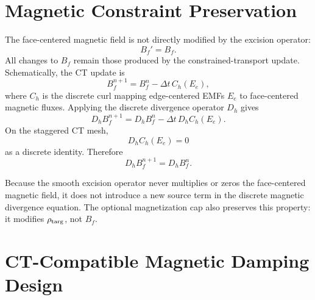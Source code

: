 \documentclass[11pt]{article}
\begin{document}
\section{Magnetic Constraint Preservation}

The face-centered magnetic field is not directly modified by the excision
operator:
\begin{equation}
  B_f' = B_f .
\end{equation}
All changes to \(B_f\) remain those produced by the constrained-transport
update.  Schematically, the CT update is
\begin{equation}
  B_f^{n+1}
  =
  B_f^n
  -
  \Delta t\, C_h(E_e),
\end{equation}
where \(C_h\) is the discrete curl mapping edge-centered EMFs \(E_e\) to
face-centered magnetic fluxes.  Applying the discrete divergence operator
\(D_h\) gives
\begin{equation}
  D_h B_f^{n+1}
  =
  D_h B_f^n
  -
  \Delta t\,D_h C_h(E_e).
\end{equation}
On the staggered CT mesh,
\begin{equation}
  D_h C_h(E_e) = 0
\end{equation}
as a discrete identity.  Therefore
\begin{equation}
  D_h B_f^{n+1} = D_h B_f^n .
\end{equation}

Because the smooth excision operator never multiplies or zeros the
face-centered magnetic field, it does not introduce a new source term in the
discrete magnetic divergence equation.  The optional magnetization cap also
preserves this property: it modifies \(\rho_{\rm targ}\), not \(B_f\).

\section{CT-Compatible Magnetic Damping Design}
\end{document}
